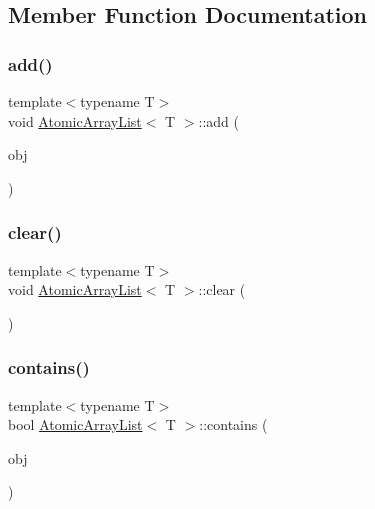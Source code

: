 \subsection{Member Function Documentation}
\mbox{\label{classAtomicArrayList_aa8b53ecb83b2565ec0b62e5681c29eb8}} 
\subsubsection{\texorpdfstring{add()}{add()}}
{\footnotesize\ttfamily template$<$typename T$>$ \\
void \hyperlink{classAtomicArrayList}{Atomic\+Array\+List}$<$ T $>$\+::add (\begin{DoxyParamCaption}\item[{T $\ast$const}]{obj }\end{DoxyParamCaption})\hspace{0.3cm}{\ttfamily [inline]}}

\mbox{\label{classAtomicArrayList_a5369a041e550e8c1c180f2a2f2aa406a}} 
\subsubsection{\texorpdfstring{clear()}{clear()}}
{\footnotesize\ttfamily template$<$typename T$>$ \\
void \hyperlink{classAtomicArrayList}{Atomic\+Array\+List}$<$ T $>$\+::clear (\begin{DoxyParamCaption}{ }\end{DoxyParamCaption})\hspace{0.3cm}{\ttfamily [inline]}}

\mbox{\label{classAtomicArrayList_ae85b1f8c002815f4e7306b845cba23ea}} 
\subsubsection{\texorpdfstring{contains()}{contains()}}
{\footnotesize\ttfamily template$<$typename T$>$ \\
bool \hyperlink{classAtomicArrayList}{Atomic\+Array\+List}$<$ T $>$\+::contains (\begin{DoxyParamCaption}\item[{T $\ast$const}]{obj }\end{DoxyParamCaption})\hspace{0.3cm}{\ttfamily [inline]}}


